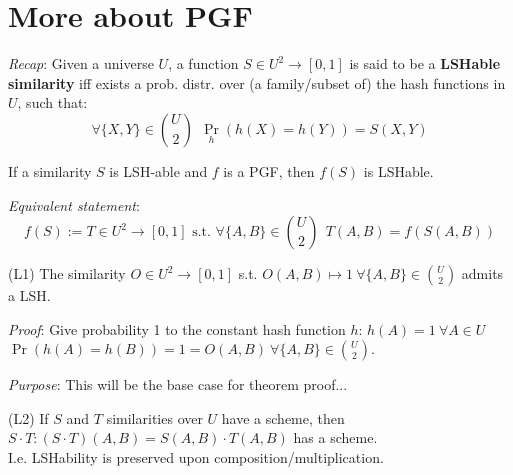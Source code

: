 \section{More about PGF}  %
	
	\textit{Recap}: Given a universe $U$, a function $S \in U^2 \to [0, 1]$ is said to be a \textbf{LSHable similarity} iff exists a prob. distr. over (a family/subset of) the hash functions in $U$, such that: 
	\begin{equation}
	\forall \{X, Y\} \in \binom{U}{2}\ \ \Pr_h(h(X)=h(Y)) = S(X, Y)
	\end{equation}
	
	\thm \label{t:pgf_1} If a similarity $S$ is LSH-able and $f$ is a PGF, then $f(S)$ is LSHable.
	
	\textit{Equivalent statement}:
	\begin{equation}
	f(S) := T \in U^2 \to [0, 1] \text{ s.t. } \forall \{A, B\} \in \binom{U}{2}\ \ T(A, B) = f(S(A, B))
	\end{equation}
	
	
	\lem \label{l:pgf_1} (L1) The similarity $O \in U^2 \to [0, 1]$ s.t. $O(A, B) \mapsto 1 \ \forall \{A, B\} \in \binom{U}{2}$ admits a LSH.
	
	\textit{Proof}: Give probability 1 to the constant hash function $h$: $h(A)=1 \ \forall A\in U$\\
	$\Pr(h(A)=h(B))=1=O(A,B) \ \forall \{A, B\} \in \binom{U}{2}$.
	
	
	\textit{Purpose}: This will be the base case for theorem proof...
	
	\lem \label{l:pgf_2} (L2) If $S$ and $T$ similarities over $U$ have a scheme, then $S \cdot T : (S \cdot T)(A, B) = S(A, B)\cdot T(A, B)$ has a scheme. \\
	I.e. LSHability is preserved upon composition/multiplication.
	
